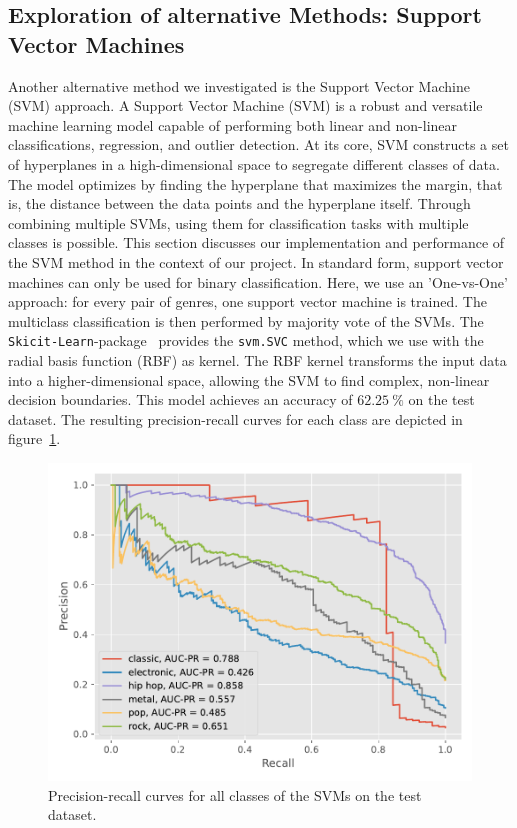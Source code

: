 \documentclass[
  12pt,
  bibliography=totoc,     %
  captions=tableheading,  %
  titlepage=firstiscover, %
]{scrartcl}
\begin{document}
\subsection{Exploration of alternative Methods: Support Vector Machines}
Another alternative method we investigated is the Support Vector Machine (SVM) approach.
A Support Vector Machine (SVM) is a robust and versatile machine learning model capable of performing both linear and non-linear classifications, regression, and outlier
detection. At its core, SVM constructs a set of hyperplanes in a high-dimensional space to segregate different classes of data. The model optimizes by finding
the hyperplane that maximizes the margin, that is, the distance between the data points and the hyperplane itself.
Through combining multiple SVMs, using them for classification tasks with multiple classes is possible.
This section discusses our implementation and performance of the SVM method in the context of our project.
In standard form, support vector machines can only be used for binary classification. Here, we use an 'One-vs-One' approach: for every pair of genres, one support vector
machine is trained. The multiclass classification is then performed by majority vote of the SVMs.
The \texttt{Skicit-Learn}-package~\cite{scikit-learn} provides the \texttt{svm.SVC} method,
which we use with the radial basis function (RBF) as kernel. The RBF kernel transforms the input data into a higher-dimensional space, allowing the SVM to find complex, non-linear decision boundaries. This model achieves an accuracy of $\SI{62.25}{\percent}$ on the test dataset. The resulting
precision-recall curves for each class are depicted in figure~\ref{fig:svm_pr}.
\begin{figure}[H]
  \centering
  \includegraphics[scale=0.6]{figures/svm/PR_SVM.pdf}
  \caption{Precision-recall curves for all classes of the SVMs on the test dataset.}
  \label{fig:svm_pr}
\end{figure}
\end{document}
